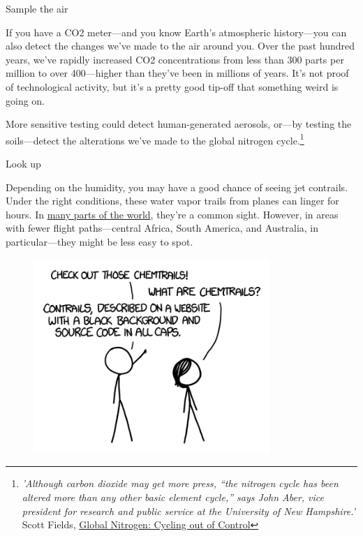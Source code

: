 {{Sample the air}

{If you have a CO2 meter—and you know Earth's atmospheric history—you can also detect the changes we've made to the air around you. Over the past hundred years, we've rapidly increased CO2 concentrations from less than 300 parts per million to over 400—higher than they've been in millions of years. It's not proof of technological activity, but it's a pretty good tip-off that something weird is going on.}

{More sensitive testing could detect human-generated aerosols, or—by testing the soils—detect the alterations we've made to the global nitrogen cycle.{\footnote{ \emph{'Although carbon dioxide may get more press, “the nitrogen cycle has been altered more than any other basic element cycle,” says John Aber, vice president for research and public service at the University of New Hampshire.'} Scott Fields, \href{http://www.ncbi.nlm.nih.gov/pmc/articles/PMC1247398/}{Global Nitrogen: Cycling out of Control}} } }

{Look up}

{Depending on the humidity, you may have a good chance of seeing jet contrails. Under the right conditions, these water vapor trails from planes can linger for hours. In \href{http://contrailscience.com/map/}{many parts of the world}, they're a common sight. However, in areas with fewer flight paths—central Africa, South America, and Australia, in particular—they might be less easy to spot.}

\begin{figure}[!htbp]
\centering
\includegraphics[scale=0.5, max width=0.8\textwidth]{imgs/a/60/sample_chemtrails.png}
\caption{}
\end{figure}

}
